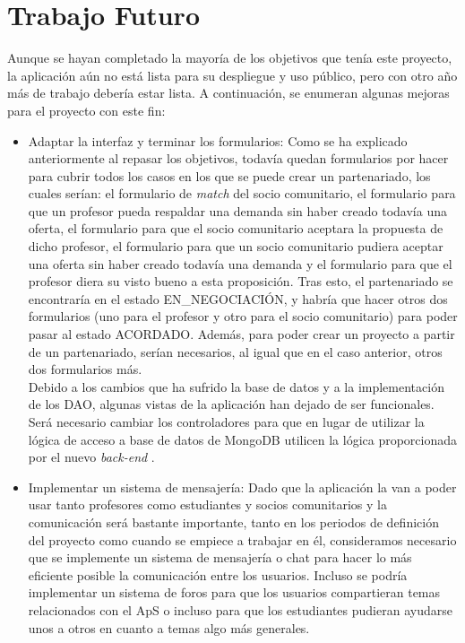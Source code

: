 \documentclass[11pt]{book}
\begin{document}
	\section{Trabajo Futuro}
	Aunque se hayan completado la mayoría de los objetivos que tenía este proyecto, la aplicación aún no está lista para su despliegue y uso público, pero con otro año más de trabajo debería estar lista. A continuación, se enumeran algunas mejoras para el proyecto con este fin:
	\begin{itemize}
		\item Adaptar la interfaz y terminar los formularios: Como se ha explicado anteriormente al repasar los objetivos, todavía quedan formularios por hacer para cubrir todos los casos en los que se puede crear un partenariado, los cuales serían: el formulario de \emph{match} del socio comunitario, el formulario para que un profesor pueda respaldar una demanda sin haber creado todavía una oferta, el formulario para que el socio comunitario aceptara la propuesta de dicho profesor, el formulario para que un socio comunitario pudiera aceptar una oferta sin haber creado todavía una demanda y el formulario para que el profesor diera su visto bueno a esta proposición. Tras esto, el partenariado se encontraría en el estado EN\_NEGOCIACIÓN, y habría que hacer otros dos formularios (uno para el profesor y otro para el socio comunitario) para poder pasar al estado ACORDADO. Además, para poder crear un proyecto a partir de un partenariado, serían necesarios, al igual que en el caso anterior, otros dos formularios más.\\
		Debido a los cambios que ha sufrido la base de datos y a la implementación de los DAO, algunas vistas de la aplicación han dejado de ser funcionales. Será necesario cambiar los controladores para que en lugar de utilizar la lógica de acceso a base de datos de MongoDB utilicen la lógica proporcionada por el nuevo \emph{ back-end }.
		\item Implementar un sistema de mensajería: Dado que la aplicación la van a poder usar tanto profesores como estudiantes y socios comunitarios y la comunicación será bastante importante, tanto en los periodos de definición del proyecto como cuando se empiece a trabajar en él, consideramos necesario que se implemente un sistema de mensajería o chat para hacer lo más eficiente posible la comunicación entre los usuarios. Incluso se podría implementar un sistema de foros para que los usuarios compartieran temas relacionados con el ApS o incluso para que los estudiantes pudieran ayudarse unos a otros en cuanto a temas algo más generales.

\end{itemize}
\end{document}
